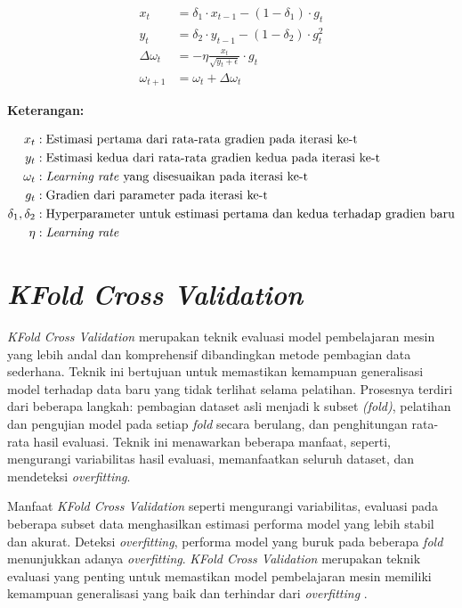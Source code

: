     \begin{equation}
    \begin{aligned}
        x_t &= \delta_1 \cdot x_{t-1} - (1 - \delta_1) \cdot g_t \\
        y_t &= \delta_2 \cdot y_{t-1} - (1 - \delta_2) \cdot g_t^2 \\
        \Delta \omega_t &= -\eta \frac{x_t}{\sqrt{y_t + \epsilon}} \cdot g_t \\
        \omega_{t+1} &= \omega_t + \Delta \omega_t
    \end{aligned}
    \label{Adam}
    \end{equation}

 \textbf{Keterangan:}

    \begin{align*}
    x_t &: \text{Estimasi pertama dari rata-rata gradien pada iterasi ke-t}\\
    y_t &: \text{Estimasi kedua dari rata-rata gradien kedua pada iterasi ke-t}\\
    \omega_t &: \text{\textit{Learning rate} yang disesuaikan pada iterasi ke-t}\\
    g_t &: \text{Gradien dari parameter pada iterasi ke-t}\\
    \delta_1, \delta_2 &: \text{Hyperparameter untuk estimasi pertama dan kedua terhadap gradien baru}\\
    \eta &: \text{\textit{Learning rate}}\\
\end{align*}


\section{\textit{KFold Cross Validation}}

\textit{KFold Cross Validation} merupakan teknik evaluasi model pembelajaran mesin yang lebih andal dan komprehensif dibandingkan 
metode pembagian data sederhana. Teknik ini bertujuan untuk memastikan kemampuan generalisasi model terhadap data baru yang 
tidak terlihat selama pelatihan. Prosesnya terdiri dari beberapa langkah: pembagian dataset asli menjadi k subset \textit{(fold)},
 pelatihan dan pengujian model 
pada setiap \textit{fold} secara berulang, dan penghitungan rata-rata hasil evaluasi. Teknik ini menawarkan beberapa manfaat, 
seperti, mengurangi variabilitas hasil evaluasi, memanfaatkan seluruh dataset, dan mendeteksi \textit{overfitting}.

Manfaat \textit{KFold Cross Validation} seperti mengurangi variabilitas, evaluasi pada beberapa subset data menghasilkan 
estimasi performa model yang lebih stabil dan akurat. Deteksi \textit{overfitting}, performa model yang buruk pada beberapa 
\textit{fold} menunjukkan adanya \textit{overfitting}.
\textit{KFold Cross Validation} merupakan teknik evaluasi yang penting untuk memastikan model pembelajaran mesin memiliki
kemampuan generalisasi yang baik dan terhindar dari \textit{overfitting} \cite{hastie2009elements}.







